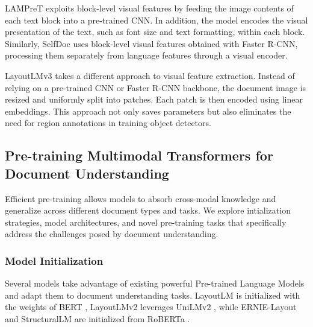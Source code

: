 \ac{LAMPreT} \citep{wu2021lampret} exploits block-level visual features by feeding the image contents of each text block into a pre-trained \ac{CNN}. In addition, the model encodes the visual presentation of the text, such as font size and text formatting, within each block. Similarly, SelfDoc \citep{li2021selfdoc} uses block-level visual features obtained with Faster R-CNN, processing them separately from language features through a visual encoder.  

LayoutLMv3 \citep{huang2022layoutlmv3} takes a different approach to visual feature extraction. Instead of relying on a pre-trained \ac{CNN} or Faster R-CNN backbone, the document image is resized and uniformly split into patches. Each patch is then encoded using linear embeddings. This approach not only saves parameters but also eliminates the need for region annotations in training object detectors.



\subsection{Pre-training Multimodal Transformers for Document Understanding}
\label{section:related-document-understanding-pretraining}

Efficient pre-training allows models to absorb cross-modal knowledge and generalize across different document types and tasks. We explore intialization strategies, model architectures, and novel pre-training tasks that specifically address the challenges posed by document understanding.

\subsubsection{Model Initialization} 

Several models take advantage of existing powerful Pre-trained Language Models and adapt them to document understanding tasks. LayoutLM \citep{xu2020layoutlm} is initialized with the weights of \ac{BERT} \citep{devlin2018bert}, LayoutLMv2 \citep{xu2020layoutlmv2} leverages UniLMv2 \citep{bao2020unilmv2}, while ERNIE-Layout \citep{peng2022ernie} and StructuralLM \citep{li2021structurallm} are initialized from RoBERTa \citep{liu2019roberta}.


